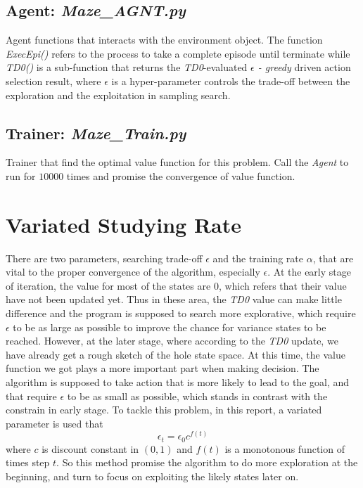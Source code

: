 \documentclass{article}
\begin{document}
		\subsection{Agent: \textit{Maze\_AGNT.py}}
			Agent functions that interacts with the environment object.
			The function \textit{ExecEpi()} refers to the process to take a complete
			episode until terminate while \textit{TD0()} is a sub-function that returns
			the \textit{TD0}-evaluated \textit{$\epsilon$ - greedy} driven action selection result,
			where $\epsilon$ is a hyper-parameter controls the trade-off between
			the exploration and the exploitation in sampling search.
		\subsection{Trainer: \textit{Maze\_Train.py}}
			Trainer that find the optimal value function for this problem.
			Call the \textit{Agent} to run for $10000$ times and promise the convergence
			of value function.
	
	\section{Variated Studying Rate}
		There are two parameters, searching trade-off $\epsilon$ and the training rate $\alpha$,
		that are vital to the proper convergence of the algorithm, especially $\epsilon$.
		At the early stage of iteration, the value for most of the states are $0$, which refers that
		their value have not been updated yet. Thus in these area, the \textit{TD0} value can make
		little difference and the program is supposed to search more explorative, which require
		$\epsilon$ to be as large as possible to improve the chance for variance states to be reached.
		However, at the later stage, where according to the \textit{TD0} update, 
		we have already get a rough sketch of the hole state space. At this time, the value function
		we got plays a more important part when making decision. The algorithm is supposed to
		take action that is more likely to lead to the goal, and that require
		$\epsilon$ to be as small as possible, which stands in contrast with the constrain in early
		stage. To tackle this problem, in this report, a variated parameter is used that
		\[
			\epsilon_t = \epsilon_0c^{f(t)}
		\]
		where $c$ is discount constant in $(0, 1)$ and $f(t)$ is a monotonous function of times step
		$t$. So this method promise the algorithm to do more exploration at the beginning,
		and turn to focus on exploiting the likely states later on.
		
\end{document}
